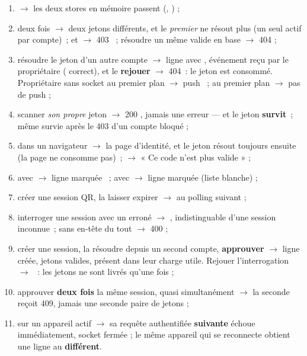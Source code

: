 \begin{enumerate}[leftmargin=1.6em]
  \item {} $\rightarrow$ les deux stores en mémoire passent
        (, ) ;
  \item {} deux fois $\rightarrow$ deux jetons
        différents, et le \emph{premier} ne résout plus (un seul actif par compte)~;
         et  $\rightarrow$ 403
        ~; résoudre un  même valide en base
        $\rightarrow$ 404 ;
  \item résoudre le jeton  d'un autre compte $\rightarrow$ ligne
         avec , événement
         reçu par le propriétaire (
        correct), et le \textbf{rejouer} $\rightarrow$ 404~: le jeton est consommé.
        Propriétaire sans socket au premier plan $\rightarrow$ push
        ~; au premier plan $\rightarrow$ pas de push ;
  \item scanner \emph{son propre} jeton $\rightarrow$ 200 , jamais
        une erreur --- et le jeton \textbf{survit}~; même survie après le 403 d'un
        compte bloqué ;
  \item {} dans un navigateur $\rightarrow$ la page d'identité, et
        le jeton résout toujours ensuite (la page ne consomme pas)~;
         $\rightarrow$ « Ce code n'est plus valide » ;
  \item {} avec  $\rightarrow$ ligne
        marquée ~; avec  $\rightarrow$ ligne
        marquée  (liste blanche) ;
  \item créer une session QR, la laisser expirer $\rightarrow$  au
        polling suivant ;
  \item interroger une session avec un  erroné $\rightarrow$
        , indistinguable d'une session inconnue~; sans en-tête du tout
        $\rightarrow$ 400 ;
  \item créer une session, la résoudre depuis un second compte, \textbf{approuver}
        $\rightarrow$ ligne  créée, jetons valides, 
        présent dans leur charge utile. Rejouer l'interrogation $\rightarrow$
        ~: les jetons ne sont livrés qu'une fois ;
  \item approuver \textbf{deux fois} la même session, quasi simultanément $\rightarrow$
        la seconde reçoit 409, jamais une seconde paire de jetons ;
  \item {} sur un appareil actif $\rightarrow$
        sa requête authentifiée \textbf{suivante} échoue immédiatement, socket fermée ;
        le même appareil qui se reconnecte obtient une ligne au  \textbf{différent}.
\end{enumerate}

